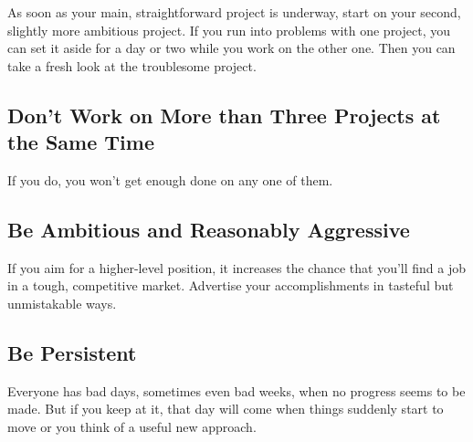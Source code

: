 \documentclass[12pt]{article}
\begin{document}
As soon as your main, straightforward project is underway, start on your second, slightly more ambitious project.
If you run into problems with one project, you can set it aside for a day or two while you work on the other one.
Then you can take a fresh look at the troublesome project.

\subsection*{Don't Work on More than Three Projects at the Same Time}

If you do, you won't get enough done on any one of them.

\subsection*{Be Ambitious and Reasonably Aggressive}

If you aim for a higher-level position, it increases the chance that you'll find a job in a tough, competitive market.
Advertise your accomplishments in tasteful but unmistakable ways.

\subsection*{Be Persistent}

Everyone has bad days, sometimes even bad weeks, when no progress seems to be made.
But if you keep at it, that day will come when things suddenly start to move or you think of a useful new approach.

\end{document}
